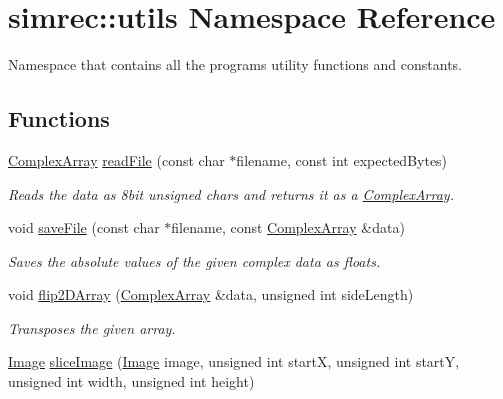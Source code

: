 \hypertarget{namespacesimrec_1_1utils}{\section{simrec\-:\-:utils \-Namespace \-Reference}
\label{namespacesimrec_1_1utils}
}


\-Namespace that contains all the programs utility functions and constants.  


\subsection*{\-Functions}
\begin{DoxyCompactItemize}
\item 
\hypertarget{namespacesimrec_1_1utils_ad5039d23d01e909ad3f8838245ee9afd}{\hyperlink{classsimrec_1_1ComplexArray}{\-Complex\-Array} \hyperlink{namespacesimrec_1_1utils_ad5039d23d01e909ad3f8838245ee9afd}{read\-File} (const char $\ast$filename, const int expected\-Bytes)}\label{namespacesimrec_1_1utils_ad5039d23d01e909ad3f8838245ee9afd}

\begin{DoxyCompactList}\small\item\em \-Reads the data as 8bit unsigned chars and returns it as a \hyperlink{classsimrec_1_1ComplexArray}{\-Complex\-Array}. \end{DoxyCompactList}\item 
\hypertarget{namespacesimrec_1_1utils_aae1d831d3016debab78d48e7ad273939}{void \hyperlink{namespacesimrec_1_1utils_aae1d831d3016debab78d48e7ad273939}{save\-File} (const char $\ast$filename, const \hyperlink{classsimrec_1_1ComplexArray}{\-Complex\-Array} \&data)}\label{namespacesimrec_1_1utils_aae1d831d3016debab78d48e7ad273939}

\begin{DoxyCompactList}\small\item\em \-Saves the absolute values of the given complex data as floats. \end{DoxyCompactList}\item 
void \hyperlink{namespacesimrec_1_1utils_a4b4a52628c9ceed1c6a6f3890ac9c0a4}{flip2\-D\-Array} (\hyperlink{classsimrec_1_1ComplexArray}{\-Complex\-Array} \&data, unsigned int side\-Length)
\begin{DoxyCompactList}\small\item\em \-Transposes the given array. \end{DoxyCompactList}\item 
\hypertarget{namespacesimrec_1_1utils_abd440a72e5c2b9899fa67deaef12bdeb}{\hyperlink{classsimrec_1_1Image}{\-Image} \hyperlink{namespacesimrec_1_1utils_abd440a72e5c2b9899fa67deaef12bdeb}{slice\-Image} (\hyperlink{classsimrec_1_1Image}{\-Image} image, unsigned int start\-X, unsigned int start\-Y, unsigned int width, unsigned int height)}\label{namespacesimrec_1_1utils_abd440a72e5c2b9899fa67deaef12bdeb}


\end{DoxyCompactItemize}
